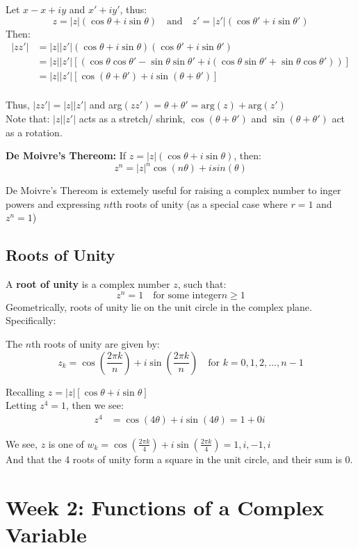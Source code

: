 \documentclass[12pt]{article}
\theoremstyle{definition}
\theoremstyle{plain}
\begin{document}
\begin{proofbox}
Let $x - x + iy$ and $x' + iy'$, thus:
$$z = |z|(\cos\theta + i\sin\theta) \quad \text{and} \quad z' = |z'|(\cos\theta' + i\sin\theta')$$
Then:
\begin{align*}
|zz'| &= |z||z'|(\cos\theta + i\sin\theta)(\cos\theta' + i\sin\theta') \\
&= |z||z'|\left[(\cos\theta\cos\theta' - \sin\theta\sin\theta' + i(\cos\theta\sin\theta' + \sin\theta\cos\theta'))\right] \\
&= |z||z'|\left[\cos(\theta + \theta') + i\sin(\theta + \theta')\right] \\
\end{align*}

Thus, $|zz'| = |z||z'|$ and arg$(zz') = \theta + \theta' = \text{arg}(z) + \text{arg}(z')$ \\
Note that: $|z||z'|$ acts as a stretch/ shrink, $\cos(\theta + \theta')$ and $\sin(\theta + \theta')$ act as a rotation. 
\end{proofbox}

\begin{corollarybox}
\textbf{De Moivre's Thereom:} If $z = |z|(\cos\theta + i\sin\theta)$, then:
$$z^n = |z|^n \cos(n\theta) + i sin(\theta)$$
\end{corollarybox}

\noindent De Moivre's Thereom is extemely useful for raising a complex number to inger powers and expressing $nt$th roots of unity (as a special case where $r=1$ and $z^n = 1$)

\pagebreak

\subsection{Roots of Unity}
A \textbf{root of unity} is a complex number $z$, such that:
$$z^n = 1 \quad \text{for some integer} n \geq 1$$
Geometrically, roots of unity lie on the unit circle in the complex plane.\\
Specifically:
\begin{definitionbox}
  The $n$th roots of unity are given by:
  $$z_k = \cos\left(\frac{2\pi k}{n}\right) + i\sin\left(\frac{2\pi k}{n}\right) \quad \text{for } k = 0,1,2,\ldots,n-1$$
\end{definitionbox}


\begin{examplebox}
    Recalling $z = |z|\left[\cos\theta + i\sin\theta\right]$ \\
    Letting $z^4 = 1$, then we see:
    \begin{align*}
      z^4 &= \cos(4\theta) + i\sin(4\theta) =1 + 0i\ 
    \end{align*}

    We see, $z$ is one of $w_k = \cos\left(\frac{2\pi k}{4}\right) + i\sin\left(\frac{2\pi k}{4}\right) = 1, i,-1, i$\\
    And that the 4 roots of unity form a square in the unit circle, and their sum is 0.
\end{examplebox}


\section{Week 2: Functions of a Complex Variable}
\end{document}
